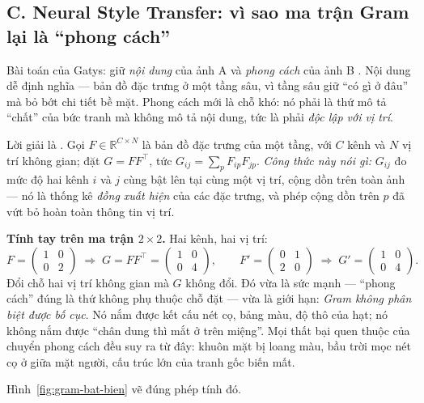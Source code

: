 \documentclass[../../../deep_learning.tex]{subfiles}
\begin{document}
\subsection{C. Neural Style Transfer: vì sao ma trận Gram lại là ``phong cách''}
Bài toán của Gatys: giữ \emph{nội dung} của ảnh A và \emph{phong cách} của ảnh B \cite{gatys2016style}. Nội dung dễ định nghĩa --- bản đồ đặc trưng ở một tầng sâu, vì tầng sâu giữ ``có gì ở đâu'' mà bỏ bớt chi tiết bề mặt. Phong cách mới là chỗ khó: nó phải là thứ mô tả ``chất'' của bức tranh mà không mô tả nội dung, tức là phải \emph{độc lập với vị trí}.

Lời giải là . Gọi \(F \in \mathbb{R}^{C\times N}\) là bản đồ đặc trưng của một tầng, với \(C\) kênh và \(N\) vị trí không gian; đặt \(G = FF^{\!\top}\), tức \(G_{ij} = \sum_{p} F_{ip}F_{jp}\). \emph{Công thức này nói gì:} \(G_{ij}\) đo mức độ hai kênh \(i\) và \(j\) cùng bật lên tại cùng một vị trí, cộng dồn trên toàn ảnh --- nó là thống kê \emph{đồng xuất hiện} của các đặc trưng, và phép cộng dồn trên \(p\) đã vứt bỏ hoàn toàn thông tin vị trí.

\textbf{Tính tay trên ma trận \(2\times 2\).} Hai kênh, hai vị trí:
\[
F=\begin{pmatrix}1&0\\0&2\end{pmatrix}
\;\Rightarrow\;
G=FF^{\!\top}=\begin{pmatrix}1&0\\0&4\end{pmatrix},
\qquad
F'=\begin{pmatrix}0&1\\2&0\end{pmatrix}
\;\Rightarrow\;
G'=\begin{pmatrix}1&0\\0&4\end{pmatrix}.
\]
Đổi chỗ hai vị trí không gian mà \(G\) không đổi. Đó vừa là sức mạnh --- ``phong cách'' đúng là thứ không phụ thuộc chỗ đặt --- vừa là giới hạn: \emph{Gram không phân biệt được bố cục}. Nó nắm được kết cấu nét cọ, bảng màu, độ thô của hạt; nó không nắm được ``chân dung thì mắt ở trên miệng''. Mọi thất bại quen thuộc của chuyển phong cách đều suy ra từ đây: khuôn mặt bị loang màu, bầu trời mọc nét cọ ở giữa mặt người, cấu trúc lớn của tranh gốc biến mất.

Hình~\ref{fig:gram-bat-bien} vẽ đúng phép tính đó.
\end{document}
